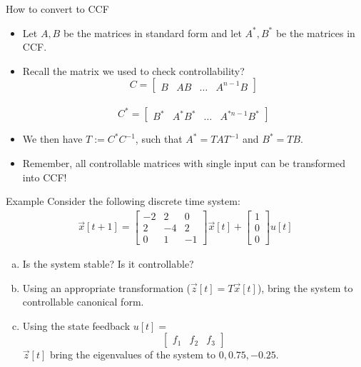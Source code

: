 \documentclass{beamer}
\begin{document}
\begin{frame}{How to convert to CCF}
\begin{itemize}
\item Let $A,B$ be the matrices in standard form and let $A^*,B^*$ be the matrices in CCF. \pause
\item Recall the matrix we used to check controllability?\\ \pause 
\[C = \begin{bmatrix}
B & AB & \hdots & A^{n-1}B
\end{bmatrix}\] \\  
\[ C^* = \begin{bmatrix}
B^*& A^*B^* & \hdots & A^{*n-1}B^*
\end{bmatrix}\]
\item We then have $T := C^*C^{-1}$,  such that $A^* = TAT^{-1}$ and $B^* = TB$.
\item Remember, all controllable matrices with single input can be transformed into CCF!
\end{itemize}
\end{frame}

\begin{frame}{Example}
Consider the following discrete time system:
\begin{align*}
\vec{x}[t+1] = \begin{bmatrix} 
-2&2&0\\
2&-4&2\\ 
0&1&-1
\end{bmatrix}\vec{x}[t] + \begin{bmatrix} 1 \\ 0 \\0 \end{bmatrix}u[t] 
\end{align*}

\begin{enumerate}[(a)]
\item Is the system stable? Is it controllable? 
\item Using an appropriate transformation ($\vec{z}[t] = T\vec{x}[t]$), bring the system to controllable canonical form. 
\item Using the state feedback $u[t] =$ \[\begin{bmatrix} f_1 & f_2 & f_3  \end{bmatrix}\] $\vec{z}[t]$ bring the eigenvalues of the system to $0,0.75, -0.25$.
\end{enumerate}
\end{frame}
\end{document}
